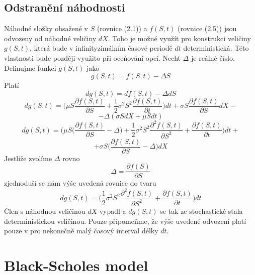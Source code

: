\documentclass[a4paper]{book}
\begin{document}
\section{Odstranění náhodnosti}

Náhodné složky obsažené v $S$ (rovnice (2.1)) a $f(S,t)$ (rovnice (2.5)) jsou odvozeny od náhodné veličiny $dX$. Toho je možné využít pro konstrukci veličiny $g(S,t)$, která bude v infinityzimálním časové periodě $dt$ deterministická. Této vlastnosti bude později využito při oceňování opcí. Nechť $\Delta$ je reálné číslo. Definujme funkci $g(S,t)$ jako
\begin{equation*}
g(S,t) = f(S,t)-\Delta S
\end{equation*}
Platí
\begin{equation*}
dg(S,t) = df(S,t)-\Delta dS
\end{equation*}
\begin{equation*}
dg(S,t) = \Bigg( \mu S \frac{\partial f(S,t)}{\partial S} + \frac{1}{2}\sigma^2S^2 \frac{\partial f(S,t)}{\partial t}\Bigg)dt + \sigma S \frac{\partial f(S,t)}{\partial S}dX -
\end{equation*}
\begin{equation*}
- \Delta(\sigma S dX + \mu S dt)
\end{equation*}
\begin{equation*}
dg(S,t) = \Bigg( \mu S \Big( \frac{\partial f(S,t)}{\partial S} - \Delta \Big) + \frac{1}{2}\sigma^2 S^2 \frac{\partial^2 f(S,t)}{\partial S^2} + \frac{\partial f(S,t)}{\partial t} \Bigg)dt +
\end{equation*}
\begin{equation*}
+ \sigma S \Bigg( \frac{\partial f(S,t)}{\partial S}- \Delta \Bigg)dX
\end{equation*}
Jestliže zvolíme $\Delta$ rovno
\begin{equation*}
\Delta = \frac{\partial f(S)}{\partial S}
\end{equation*}
zjednoduší se nám výše uvedená rovnice do tvaru
\begin{equation*}
dg(S,t) = \Bigg( \frac{1}{2}\sigma^2 S^2 \frac{\partial^2 f(S,t)}{\partial S^2} + \frac{\partial f(S,t)}{\partial t} \Bigg)dt
\end{equation*}
Člen s náhodnou veličinou $dX$ vypadl a $dg(S,t)$ se tak ze stochastické stala deterministickou veličinou. Pouze připomeňme, že výše uvedené odvození platí pouze v pro nekonečně malý časový interval délky $dt$.

\chapter{Black-Scholes model}
\end{document}

